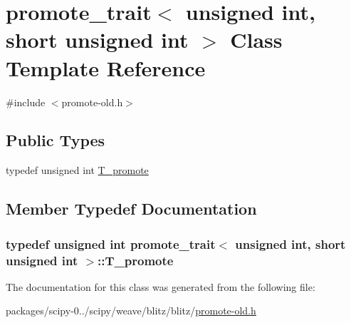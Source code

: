 \hypertarget{classpromote__trait_3_01unsigned_01int_00_01short_01unsigned_01int_01_4}{}\section{promote\+\_\+trait$<$ unsigned int, short unsigned int $>$ Class Template Reference}
\label{classpromote__trait_3_01unsigned_01int_00_01short_01unsigned_01int_01_4}


{\ttfamily \#include $<$promote-\/old.\+h$>$}

\subsection*{Public Types}
\begin{DoxyCompactItemize}
\item 
typedef unsigned int \hyperlink{classpromote__trait_3_01unsigned_01int_00_01short_01unsigned_01int_01_4_a255fa13bc24d4ff75d137793fa59f21c}{T\+\_\+promote}
\end{DoxyCompactItemize}


\subsection{Member Typedef Documentation}
\hypertarget{classpromote__trait_3_01unsigned_01int_00_01short_01unsigned_01int_01_4_a255fa13bc24d4ff75d137793fa59f21c}{}
\subsubsection[{T\+\_\+promote}]{\setlength{\rightskip}{0pt plus 5cm}typedef unsigned int {\bf promote\+\_\+trait}$<$ unsigned int, short unsigned int $>$\+::{\bf T\+\_\+promote}}\label{classpromote__trait_3_01unsigned_01int_00_01short_01unsigned_01int_01_4_a255fa13bc24d4ff75d137793fa59f21c}


The documentation for this class was generated from the following file\+:\begin{DoxyCompactItemize}
\item 
packages/scipy-\/0../scipy/weave/blitz/blitz/\hyperlink{promote-old_8h}{promote-\/old.\+h}\end{DoxyCompactItemize}
